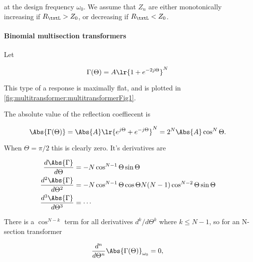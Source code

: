 at the design frequency \( \omega_0 \).  We assume that \( Z_n \) are either monotonically increasing if \( R_\txtL > Z_0 \), or decreasing if \( R_\txtL < Z_0 \).

\paragraph{Binomial multisection transformers}

Let

\begin{equation}\label{eqn:uwavesDeck7MultisectionTransformersCore:120}
\Gamma(\Theta) = A \lr{ 1 + e^{-2 j \Theta} }^N
\end{equation}

This type of a response is maximally flat, and is plotted in \cref{fig:multitransformer:multitransformerFig1}.

The absolute value of the reflection coeffiecent is

\begin{dmath}\label{eqn:uwavesDeck7MultisectionTransformersCore:160}
\Abs{\Gamma(\Theta)} 
= 
\Abs{A} \lr{ e^{j \Theta} + e^{- j \Theta} }^N
= 
2^N \Abs{A} \cos^N\Theta.
\end{dmath}

When \( \Theta = \pi/2 \) this is clearly zero.  It's derivatives are

\begin{equation}\label{eqn:uwavesDeck7MultisectionTransformersCore:180}
\begin{aligned}
\frac{d \Abs{\Gamma}}{d\Theta} &= -N \cos^{N-1} \Theta \sin\Theta \\
\frac{d^2 \Abs{\Gamma}}{d\Theta^2} &= -N \cos^{N-1} \Theta \cos\Theta N(N-1) \cos^{N-2} \Theta \sin\Theta  \\
\frac{d^3 \Abs{\Gamma}}{d\Theta^3} &= \cdots 
\end{aligned}
\end{equation}

There is a \( \cos^{N-k} \) term for all derivatives \( d^k/d\Theta^k \) where \( k \le N-1 \), so for an N-section transformer

\begin{equation}\label{eqn:uwavesDeck7MultisectionTransformersCore:140}
\frac{d^n}{d\Theta^n} \Abs{\Gamma(\Theta)}_{\omega_0} = 0,
\end{equation}

